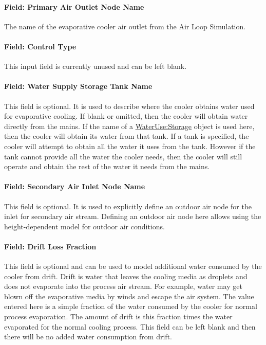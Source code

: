 \paragraph{Field: Primary Air Outlet Node Name}\label{field-primary-air-outlet-node-name-1}

The name of the evaporative cooler air outlet from the Air Loop Simulation.

\paragraph{Field: Control Type}\label{field-control-type-2}

This input field is currently unused and can be left blank.

\paragraph{Field: Water Supply Storage Tank Name}\label{field-water-supply-storage-tank-name-3}

This field is optional. It is used to describe where the cooler obtains water used for evaporative cooling. If blank or omitted, then the cooler will obtain water directly from the mains. If the name of a \hyperref[waterusestorage]{WaterUse:Storage} object is used here, then the cooler will obtain its water from that tank. If a tank is specified, the cooler will attempt to obtain all the water it uses from the tank. However if the tank cannot provide all the water the cooler needs, then the cooler will still operate and obtain the rest of the water it needs from the mains.

\paragraph{Field: Secondary Air Inlet Node Name}\label{field-secondary-air-inlet-node-name-1-000}

This field is optional. It is used to explicitly define an outdoor air node for the inlet for secondary air stream. Defining an outdoor air node here allows using the height-dependent model for outdoor air conditions.

\paragraph{Field: Drift Loss Fraction}\label{field-drift-loss-fraction-1}

This field is optional and can be used to model additional water consumed by the cooler from drift. Drift is water that leaves the cooling media as droplets and does not evaporate into the process air stream. For example, water may get blown off the evaporative media by winds and escape the air system. The value entered here is a simple fraction of the water consumed by the cooler for normal process evaporation. The amount of drift is this fraction times the water evaporated for the normal cooling process. This field can be left blank and then there will be no added water consumption from drift.

